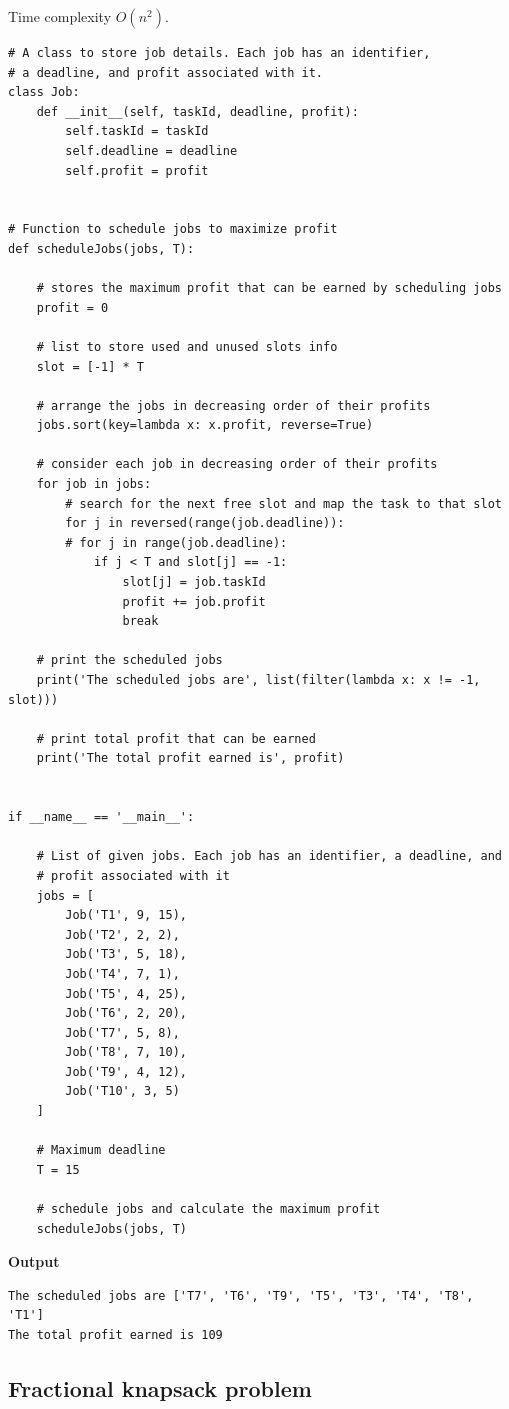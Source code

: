 \documentclass[a4paper,11pt]{book}
\begin{document}
\noindent Time complexity $O(n^2)$.
\begin{lstlisting}
# A class to store job details. Each job has an identifier,
# a deadline, and profit associated with it.
class Job:
    def __init__(self, taskId, deadline, profit):
        self.taskId = taskId
        self.deadline = deadline
        self.profit = profit
 
 
# Function to schedule jobs to maximize profit
def scheduleJobs(jobs, T):
 
    # stores the maximum profit that can be earned by scheduling jobs
    profit = 0
 
    # list to store used and unused slots info
    slot = [-1] * T
 
    # arrange the jobs in decreasing order of their profits
    jobs.sort(key=lambda x: x.profit, reverse=True)
 
    # consider each job in decreasing order of their profits
    for job in jobs:
        # search for the next free slot and map the task to that slot
        for j in reversed(range(job.deadline)):
        # for j in range(job.deadline):
            if j < T and slot[j] == -1:
                slot[j] = job.taskId
                profit += job.profit
                break
 
    # print the scheduled jobs
    print('The scheduled jobs are', list(filter(lambda x: x != -1, slot)))
 
    # print total profit that can be earned
    print('The total profit earned is', profit)
 
 
if __name__ == '__main__':
 
    # List of given jobs. Each job has an identifier, a deadline, and
    # profit associated with it
    jobs = [
        Job('T1', 9, 15), 
        Job('T2', 2, 2), 
        Job('T3', 5, 18), 
        Job('T4', 7, 1), 
        Job('T5', 4, 25),
        Job('T6', 2, 20), 
        Job('T7', 5, 8), 
        Job('T8', 7, 10), 
        Job('T9', 4, 12), 
        Job('T10', 3, 5)
    ]
 
    # Maximum deadline
    T = 15
 
    # schedule jobs and calculate the maximum profit
    scheduleJobs(jobs, T)
\end{lstlisting}
\textbf{Output}
\begin{lstlisting}
The scheduled jobs are ['T7', 'T6', 'T9', 'T5', 'T3', 'T4', 'T8', 'T1']
The total profit earned is 109
\end{lstlisting}

\subsection{Fractional knapsack problem}
\end{document}

